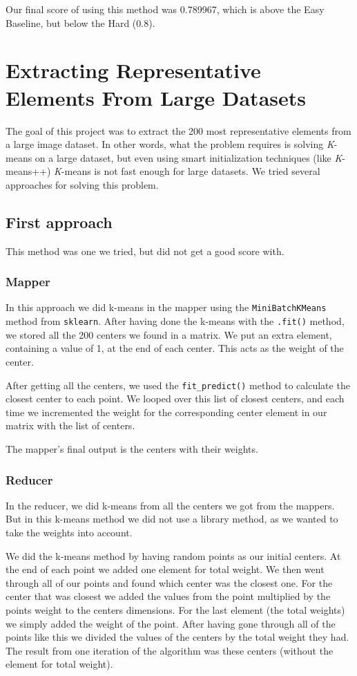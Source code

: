 \documentclass[a4paper, 11pt]{article}
\begin{document}
Our final score of using this method was 0.789967, which is above the Easy Baseline, but below the Hard (0.8).

\newpage

\section*{Extracting Representative Elements From Large Datasets}
The goal of this project was to extract the 200 most representative elements from a large image dataset. In other words, what the problem requires is solving \emph{K}-means on a large dataset, but even using smart initialization techniques (like \emph{K}-means++) \emph{K}-means is not fast enough for large datasets. We tried several approaches for solving this problem.

\subsection*{First approach}
This method was one we tried, but did not get a good score with.

\subsubsection*{Mapper}
In this approach we did k-means in the mapper using the \texttt{MiniBatchKMeans} method from \texttt{sklearn}. After having done the k-means with the \texttt{.fit()} method, we stored all the 200 centers we found in a matrix. We put an extra element, containing a value of 1, at the end of each center. This acts as the weight of the center.

After getting all the centers, we used the \texttt{fit\_predict()} method to calculate the closest center to each point. We looped over this list of closest centers, and each time we incremented the weight for the corresponding center element in our matrix with the list of centers.

The mapper’s final output is the centers with their weights.

\subsubsection*{Reducer}
In the reducer, we did k-means from all the centers we got from the mappers. But in this k-means method we did not use a library method, as we wanted to take the weights into account.

We did the k-means method by having random points as our initial centers. At the end of each point we added one element for total weight. We then went through all of our points and found which center was the closest one. For the center that was closest we added the values from the point multiplied by the points weight to the centers dimensions. For the last element (the total weights) we simply added the weight of the point. After having gone through all of the points like this we divided the values of the centers by the total weight they had. The result from one iteration of the algorithm was these centers (without the element for total weight).
\end{document}
